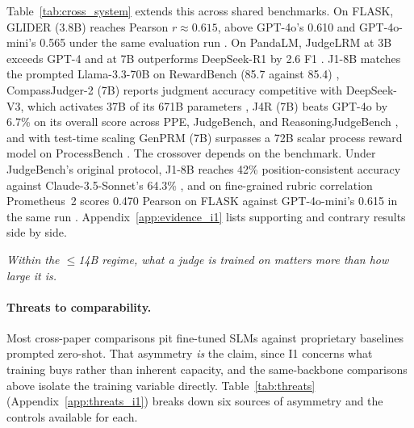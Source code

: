 \documentclass[11pt]{article}
\begin{document}
Table~\ref{tab:cross_system} extends this across shared benchmarks. On FLASK, GLIDER (3.8B) reaches Pearson $r\approx0.615$, above GPT-4o's 0.610 and GPT-4o-mini's 0.565 under the same evaluation run \citep{deshpande2024glider}. On PandaLM, JudgeLRM at 3B exceeds GPT-4 and at 7B outperforms DeepSeek-R1 by 2.6 F1 \citep{chen2025judgelrm}. J1-8B matches the prompted Llama-3.3-70B on RewardBench (85.7 against 85.4) \citep{whitehouse2025j1}, CompassJudger-2 (7B) reports judgment accuracy competitive with DeepSeek-V3, which activates 37B of its 671B parameters \citep{zhang2025compassjudger}, J4R (7B) beats GPT-4o by 6.7\% on its overall score across PPE, JudgeBench, and ReasoningJudgeBench \citep{xu2025j4r}, and with test-time scaling GenPRM (7B) surpasses a 72B scalar process reward model on ProcessBench \citep{zhao2026genprm}. The crossover depends on the benchmark. Under JudgeBench's original protocol, J1-8B reaches 42\% position-consistent accuracy against Claude-3.5-Sonnet's 64.3\% \citep{whitehouse2025j1, tan2025judgebench}, and on fine-grained rubric correlation Prometheus~2 scores 0.470 Pearson on FLASK against GPT-4o-mini's 0.615 in the same run \citep{alexandru2025atla}. Appendix~\ref{app:evidence_i1} lists supporting and contrary results side by side.

\textit{Within the $\leq$14B regime, what a judge is trained on matters more than how large it is.}

\paragraph{Threats to comparability.} Most cross-paper comparisons pit fine-tuned SLMs against proprietary baselines prompted zero-shot. That asymmetry \emph{is} the claim, since I1 concerns what training buys rather than inherent capacity, and the same-backbone comparisons above isolate the training variable directly. Table~\ref{tab:threats} (Appendix~\ref{app:threats_i1}) breaks down six sources of asymmetry and the controls available for each.
\end{document}
